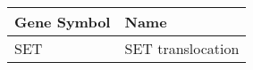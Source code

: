 \begin{tabular}{ll}
\toprule
Gene Symbol &              Name \\
\midrule
        SET & SET translocation \\
\bottomrule
\end{tabular}
